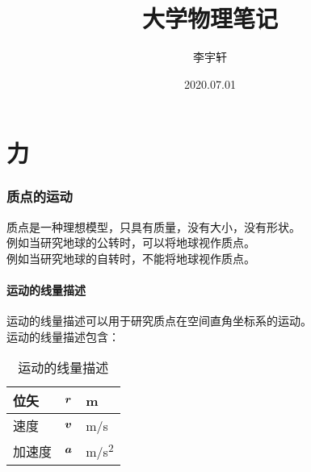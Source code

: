 \documentclass[UTF8]{ctexart}
\title{大学物理笔记}
\author{李宇轩}
\date{2020.07.01}
\newcommand*{\veb}[1]{\vb*{#1}}
\begin{document}
\maketitle

\newpage

\tableofcontents

\setlength{\parindent}{0pt}

\newpage

\part{力}

\newpage

\section{质点的运动}
    质点是一种理想模型，只具有质量，没有大小，没有形状。\\[3mm]
    例如当研究地球的公转时，可以将地球视作质点。\\[3mm]
    例如当研究地球的自转时，不能将地球视作质点。

\subsection{运动的线量描述}
    运动的线量描述可以用于研究质点在空间直角坐标系的运动。\\[3mm]
    运动的线量描述包含：
    \begin{table}[h]
        \begin{center}
            \begin{tabular}{p{60pt}|p{60 pt}|p{60 pt}}
                \hline
                位矢&$\veb{r}$&\si{m}\\ \hline
                速度&$\veb{v}$&\si{m/s}\\ \hline
                加速度&$\veb{a}$&\si{m/s^2}\\ \hline
            \end{tabular}
            \caption{运动的线量描述}
        \end{center}
    \end{table}\vspace{-25pt}
\end{document}
